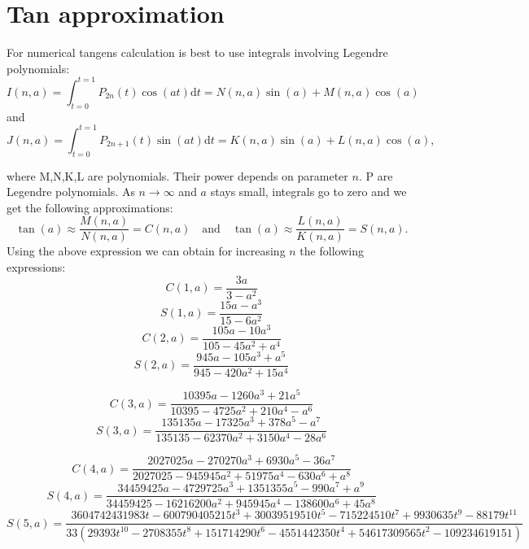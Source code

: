 \documentclass[openany, longbibliography,slovene,a4paper,12pt]{article}
\newcommand{\dif}{\mathrm{d}}
\begin{document}
\section{Tan approximation}

For numerical tangens calculation is best to use integrals involving Legendre
polynomials:
\begin{equation}
  I(n,a)=\int_{t=0}^{t=1}P_{2n}(t)\cos(at)\dif t = N(n,a)\sin(a)+M(n,a)\cos(a)
  \end{equation}
and
\begin{equation}
  J(n,a)=\int_{t=0}^{t=1}P_{2n+1}(t)\sin(at)\dif t = K(n,a)\sin(a)+L(n,a)\cos(a),
\end{equation}

where M,N,K,L are polynomials. Their power depends on parameter $n$. P are
Legendre polynomials. As $n\rightarrow\infty$ and $a$ stays small, integrals go
to zero and we get the following approximations:
\begin{equation}
  \tan(a)\approx \frac{M(n,a)}{N(n,a)}=C(n,a) \quad \mathrm{and} \quad  \tan(a)\approx \frac{L(n,a)}{K(n,a)}=S(n,a).
\end{equation}
Using the above expression we can obtain for increasing $n$ the following
expressions:
\begin{equation}
  C(1,a)=\frac{3a}{3-a^2}
\end{equation}
\begin{equation}
  S(1,a)=\frac{15a-a^3}{15-6a^2}
\end{equation}
\begin{equation}
  C(2,a)=\frac{105a-10a^3}{105-45a^2+a^4}
\end{equation}
\begin{equation}
  S(2,a)=\frac{945a-105a^3+a^5}{945-420a^2+15a^4}
\end{equation}

\begin{equation}
  C(3,a)=\frac{10395 a- 1260 a^3 +21 a^5}{10395 - 4725 a^2+ 210a^4- a^6}
\end{equation}
\begin{equation}
  S(3,a)=\frac{135135 a - 17325 a^3+378 a^5 - a^7}{135135 - 62370 a^2+ 3150 a^4- 28 a^6}
\end{equation}

\begin{equation}
  C(4,a)=\frac{2027025 a -270270 a^3 +6930 a^5- 36 a^7}{2027025 -945945 a^2 +51975 a^4 -630 a^6 +a^8}
\end{equation}
\begin{equation}
  S(4,a)=\frac{34459425 a -4729725 a^3 +1351355 a^5 -990 a^7+ a^9}{34459425 -16216200 a^2 + 945945 a^4 -138600 a^6+ 45 a^8}
\end{equation}
\scriptsize
\begin{equation}
  S(5,a)=\frac{3604742431983 t - 600790405215 t^3 + 30039519510 t^5 - 
 715224510 t^7 + 9930635 t^9 - 88179 t^{11}}{33 \left(29393 t^{10}-2708355 t^8+151714290 t^6-4551442350 t^4+54617309565 t^2-109234619151\right)}
\end{equation}
\normalsize
\end{document}

